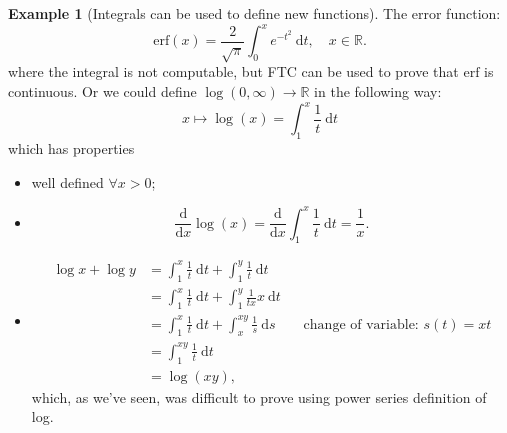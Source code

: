 \documentclass[a4paper]{article}
\newcommand{\erf}{\text{erf}}
\theoremstyle{definition}
\newtheorem{example}[defn]{Example}
\begin{document}
\begin{example}[Integrals can be used to define new functions]
The error function:
\[
\erf (x)=\frac{2}{\sqrt{\pi}} \int_0^x e^{-t^2} \ \mathrm d t,\quad x\in \mathbb R.
\]
where the integral is not computable, but FTC can be used to prove that $\erf$ is continuous. Or we could define $\log (0,\infty ) \rightarrow \mathbb R$ in the following way:
\[
x\mapsto \log (x)=\int_1^x \frac{1}{t} \ \mathrm d t
\]
which has properties\begin{itemize}
    \item well defined $\forall x>0$;
    \item
\[
\frac{\mathrm d}{\mathrm d x}\log (x)=\frac{\mathrm d}{\mathrm d x}\int_1^x \frac1t \ \mathrm d t = \frac1x .
\]
    \item
\[
\begin{aligned}\log x+\log y &= \int_1^x \frac1t \ \mathrm d t + \int_1^y \frac1t \ \mathrm d t \\ &=\int_1^x \frac1t \ \mathrm d t + \int_1^y \frac{1}{tx} x \ \mathrm d t\\&= \int_1^x \frac1t \ \mathrm d t + \int_x^{xy}\frac1s \ \mathrm d s \qquad \text{change of variable: }s(t)=xt \\&= \int_1^{xy} \frac1t \ \mathrm d t \\&= \log (xy), \end{aligned}
\]
which, as we've seen, was difficult to prove using power series definition of log.
\end{itemize}
\end{example}
\end{document}
